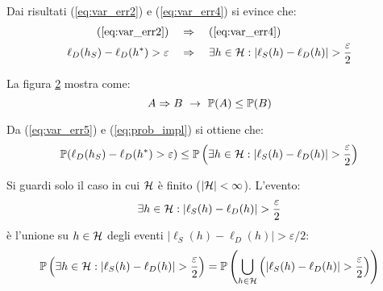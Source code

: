 Dai risultati (\ref{eq:var_err2}) e (\ref{eq:var_err4}) si 
evince che:
\begin{align}
    (\ref{eq:var_err2}) \quad &\Rightarrow \quad (\ref{eq:var_err4})\notag\\
    \ell_D(h_S)-\ell_D(h^*)>\varepsilon 
    \quad &\Rightarrow \quad \exists h \in \mathcal{H} : |\ell_S(h)-\ell_D(h)|
    > \frac{\varepsilon}{2}\label{eq:var_err5}
\end{align}

La figura \ref{fig:prob_implication} mostra come:
\begin{equation}
    A \Rightarrow B \ \rightarrow \ \mathbb{P}(A) \leq \mathbb{P}(B) \label{eq:prob_impl}
\end{equation}

\begin{figure}[h]
    \centering
    
    \caption{\label{fig:prob_implication}}
\end{figure}

Da (\ref{eq:var_err5}) e (\ref{eq:prob_impl}) si ottiene che:
\begin{equation}
    \Prob(\ell_D(h_S)-\ell_D(h^*)>\varepsilon) \leq
    \Prob\left(\exists h \in \Hpred : |\ell_S(h)-\ell_D(h)|>\frac{\varepsilon}{2}
    \right)
\end{equation}

Si guardi solo il caso in cui $\mathcal{H}$ è finito ($|\mathcal{H}|<\infty$). L'evento:
$$ \exists h \in \Hpred : |\ell_S(h)-\ell_D(h)|>\frac{\varepsilon}{2} $$
è l'unione su $h \in \mathcal{H}$ degli eventi $|\ell_S(h)-\ell_D(h)|>\varepsilon/2$:
$$ \Prob\left(\exists h \in \Hpred : |\ell_S(h)-\ell_D(h)|>\frac{\varepsilon}{2}\right)
= \Prob\left(\bigcup_{h\in\Hpred} \left(|\ell_S(h)-\ell_D(h)|>
\frac{\varepsilon}{2}\right)\right)
$$

\begin{figure}[h]
    \centering
    
    \caption{\label{fig:prob_implication}}
\end{figure}